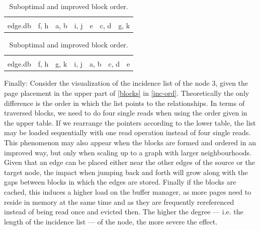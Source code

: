      \begin{table}[htp]
          \centering
    \begin{tabular}{|l | c | c | c | c | c | c|} \hline
    &&&&&&\\[-1em]
     edge.db &  \colorbox{green!30}{f}, \colorbox{green!30}{h}   & \colorbox{blue!30}{a}, \colorbox{blue!30}{b} & \colorbox{green!30}{i}, \colorbox{green!30}{j} & \colorbox{red!30}{e} & \colorbox{blue!30}{c}, \colorbox{blue!30}{d} & \colorbox{green!30}{g}, \colorbox{green!30}{k} \\ \hline
    \end{tabular}
    \vspace{0.5cm}
    
    \begin{tabular}{|l | c | c | c | c | c | c|}\hline
    &&&&&&\\[-1em]
     edge.db &  \colorbox{green!30}{f}, \colorbox{green!30}{h} & \colorbox{green!30}{g}, \colorbox{green!30}{k} & \colorbox{green!30}{i}, \colorbox{green!30}{j} & \colorbox{blue!30}{a}, \colorbox{blue!30}{b} & \colorbox{blue!30}{c}, \colorbox{blue!30}{d} & \colorbox{red!30}{e} \\ \hline
    \end{tabular}
      \caption{Suboptimal and improved block order.}
    \label{order}
       \end{table}
  
  Finally: Consider the visualization of the incidence list of the node 3, given the page placement in the upper part of \ref{blocks} in \ref{inc-ord}. 
  Theoretically the only difference is the order in which the list points to the relationships. 
  In terms of traversed blocks, we need to do four single reads when using the order given in the upper table. 
  If we rearrange the pointers according to the lower table, the list may be loaded sequentially with one read operation instead of four single reads. 
  This phenomenon may also appear when the blocks are formed and ordered in an improved way, but only when scaling up to a graph with larger neighbourhoods.
  Given that an edge can be placed either near the other edges of the source or the target node, the impact when jumping back and forth will grow along with the gaps between blocks in which the edges are stored.
  Finally if the blocks are cached, this induces a higher load on the buffer manager, as more pages need to reside in memory at the same time and as they are frequently rereferenced instead of being read once and evicted then.
  The higher the degree --- i.e. the length of the incidence list --- of the node, the more severe the effect.

